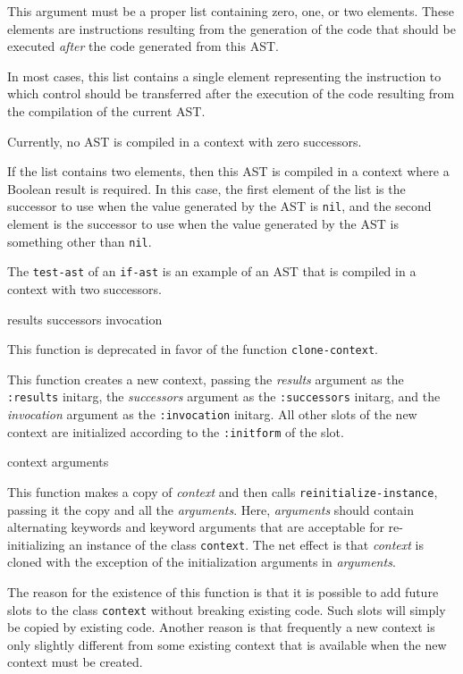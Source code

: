 

This argument must be a proper list containing zero, one, or two
elements.  These elements are instructions resulting from the
generation of the code that should be executed \emph{after} the code
generated from this AST.

In most cases, this list contains a single element representing the
instruction to which control should be transferred after the execution
of the code resulting from the compilation of the current AST.

Currently, no AST is compiled in a context with zero successors.

If the list contains two elements, then this AST is compiled in a
context where a Boolean result is required.  In this case, the first
element of the list is the successor to use when the value generated
by the AST is \texttt{nil}, and the second element is the successor to
use when the value generated by the AST is something other than
\texttt{nil}.

The \texttt{test-ast} of an \texttt{if-ast} is an example of an AST
that is compiled in a context with two successors.

 {results successors invocation}

This function is deprecated in favor of the function
\texttt{clone-context}.

This function creates a new context, passing the \textit{results}
argument as the \texttt{:results} initarg, the \textit{successors}
argument as the \texttt{:successors} initarg, and the
\textit{invocation} argument as the \texttt{:invocation} initarg.
All other slots of the new context are initialized according to the
\texttt{:initform} of the slot.

 {context \rest arguments}

This function makes a copy of \textit{context} and then calls
\texttt{reinitialize-instance}, passing it the copy and all the
\textit{arguments}.  Here, \textit{arguments} should contain
alternating keywords and keyword arguments that are acceptable for
re-initializing an instance of the class \texttt{context}.  The net
effect is that \textit{context} is cloned with the exception of the
initialization arguments in \textit{arguments}.

The reason for the existence of this function is that it is possible
to add future slots to the class \texttt{context} without breaking
existing code.  Such slots will simply be copied by existing code.
Another reason is that frequently a new context is only slightly
different from some existing context that is available when the new
context must be created.

